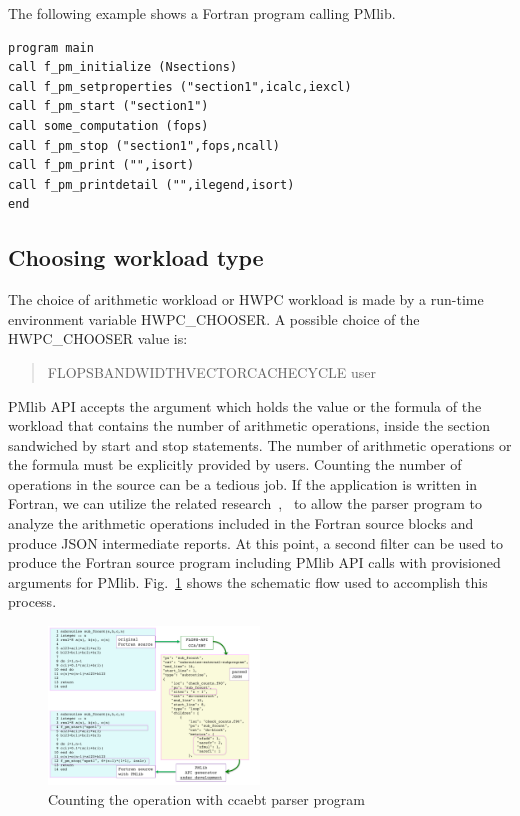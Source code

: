 \documentclass[conference]{IEEEtran}
\begin{document}
The following example shows a Fortran program calling PMlib.

\begin{lstlisting}
program main
call f_pm_initialize (Nsections)
call f_pm_setproperties ("section1",icalc,iexcl)
call f_pm_start ("section1")
call some_computation (fops)
call f_pm_stop ("section1",fops,ncall)
call f_pm_print ("",isort)
call f_pm_printdetail ("",ilegend,isort)
end
\end{lstlisting}

%
\subsection{Choosing workload type}
\label{subsection:Choosing-workload-type}

The choice of arithmetic workload or HWPC workload is made by a
run-time environment variable HWPC\_CHOOSER.
A possible choice of the HWPC\_CHOOSER value is:
\begin{quote}
\begin{small}
FLOPS\textbar BANDWIDTH\textbar VECTOR\textbar CACHE\textbar CYCLE%
\textbar user
\end{small}
\end{quote}

PMlib API accepts the argument which holds the value or the formula of the workload that contains the number of arithmetic operations, inside the section sandwiched by start and stop statements.
The number of arithmetic operations or the formula must be explicitly
provided by users. Counting the number of operations in the source can be a tedious job.
If the application is written in Fortran,
we can utilize the related research~\cite{Hoshimoto:2015},~\cite{ccaebt:HPCAsia2018}
to allow the parser program to analyze the arithmetic operations
included in the Fortran source blocks and produce JSON intermediate reports.
At this point, a second filter can be used to produce the
Fortran source program including PMlib API calls with
provisioned arguments for PMlib.
Fig.~\ref{fig:ccaebt4PMlib} shows the schematic flow used to accomplish this process.

\begin{figure}[tb]
\centering
\includegraphics[width=0.5\textwidth]{figs/ccaebt4PMlib.pdf}
\caption{Counting the operation with ccaebt parser program}
\label{fig:ccaebt4PMlib}
\end{figure}
\end{document}
